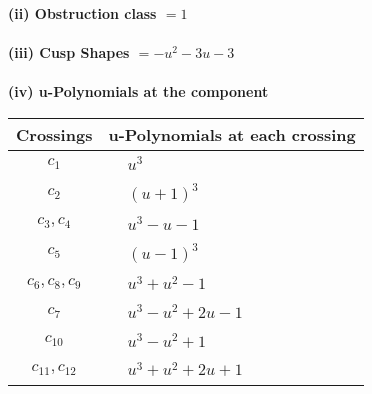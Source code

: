 \documentclass[1p]{elsarticle_modified}
\theoremstyle{definition}
\begin{document}
\flushleft \textbf{(ii) Obstruction class $= 1$}\\~\\
\flushleft \textbf{(iii) Cusp Shapes $= - u^2-3 u-3$}\\~\\
\newpage\renewcommand{\arraystretch}{1}
\flushleft \textbf{(iv) u-Polynomials at the component}\newline \\
\begin{tabular}{m{50pt}|m{274pt}}
Crossings & \hspace{64pt}u-Polynomials at each crossing \\
\hline $$\begin{aligned}c_{1}\end{aligned}$$&$\begin{aligned}
&u^3
\end{aligned}$\\
\hline $$\begin{aligned}c_{2}\end{aligned}$$&$\begin{aligned}
&(u+1)^3
\end{aligned}$\\
\hline $$\begin{aligned}c_{3},c_{4}\end{aligned}$$&$\begin{aligned}
&u^3- u-1
\end{aligned}$\\
\hline $$\begin{aligned}c_{5}\end{aligned}$$&$\begin{aligned}
&(u-1)^3
\end{aligned}$\\
\hline $$\begin{aligned}c_{6},c_{8},c_{9}\end{aligned}$$&$\begin{aligned}
&u^3+u^2-1
\end{aligned}$\\
\hline $$\begin{aligned}c_{7}\end{aligned}$$&$\begin{aligned}
&u^3- u^2+2 u-1
\end{aligned}$\\
\hline $$\begin{aligned}c_{10}\end{aligned}$$&$\begin{aligned}
&u^3- u^2+1
\end{aligned}$\\
\hline $$\begin{aligned}c_{11},c_{12}\end{aligned}$$&$\begin{aligned}
&u^3+u^2+2 u+1
\end{aligned}$\\
\hline
\end{tabular}\\~\\
\end{document}

